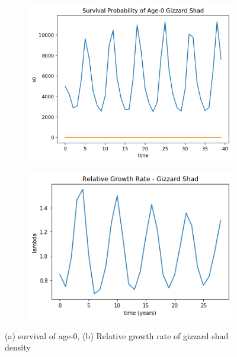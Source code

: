 \documentclass[11pt,oneside]{amsart}
\theoremstyle{definition}
\begin{document}
\begin{figure}
\centering
\begin{subfigure}[b]{.45\textwidth}
  \includegraphics[width=\textwidth]{figures/age0time.png}
   \caption{}
  \label{fig:age0time}
\end{subfigure}
\begin{subfigure}[b]{.45\textwidth}
   \includegraphics[width=\textwidth]{figures/lambda.png}
     \caption{}
\label{fig:lambda}
\end{subfigure}
\caption{(a) survival of age-0, (b) Relative growth rate of gizzard shad density}
\end{figure}    
\end{document}
